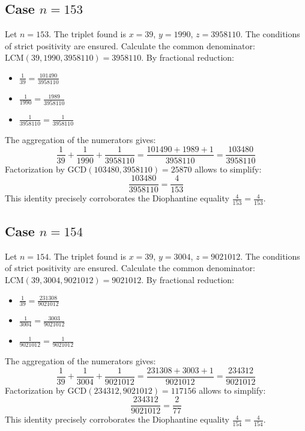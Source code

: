 \documentclass[11pt,a4paper]{article}
\begin{document}
\subsection{Case $n = 153$}
Let $n = 153$. The triplet found is $x = 39$, $y = 1990$, $z = 3958110$.
The conditions of strict positivity are ensured.
Calculate the common denominator: $\text{LCM}(39, 1990, 3958110) = 3958110$.
By fractional reduction:
\begin{itemize}
    \item $\frac{1}{39} = \frac{101490}{3958110}$
    \item $\frac{1}{1990} = \frac{1989}{3958110}$
    \item $\frac{1}{3958110} = \frac{1}{3958110}$
\end{itemize}
The aggregation of the numerators gives:
$$ \frac{1}{39} + \frac{1}{1990} + \frac{1}{3958110} = \frac{101490 + 1989 + 1}{3958110} = \frac{103480}{3958110} $$
Factorization by $\text{GCD}(103480, 3958110) = 25870$ allows to simplify:
$$ \frac{103480}{3958110} = \frac{4}{153} $$
This identity precisely corroborates the Diophantine equality $\frac{4}{153} = \frac{4}{153}$.

\subsection{Case $n = 154$}
Let $n = 154$. The triplet found is $x = 39$, $y = 3004$, $z = 9021012$.
The conditions of strict positivity are ensured.
Calculate the common denominator: $\text{LCM}(39, 3004, 9021012) = 9021012$.
By fractional reduction:
\begin{itemize}
    \item $\frac{1}{39} = \frac{231308}{9021012}$
    \item $\frac{1}{3004} = \frac{3003}{9021012}$
    \item $\frac{1}{9021012} = \frac{1}{9021012}$
\end{itemize}
The aggregation of the numerators gives:
$$ \frac{1}{39} + \frac{1}{3004} + \frac{1}{9021012} = \frac{231308 + 3003 + 1}{9021012} = \frac{234312}{9021012} $$
Factorization by $\text{GCD}(234312, 9021012) = 117156$ allows to simplify:
$$ \frac{234312}{9021012} = \frac{2}{77} $$
This identity precisely corroborates the Diophantine equality $\frac{4}{154} = \frac{4}{154}$.
\end{document}
